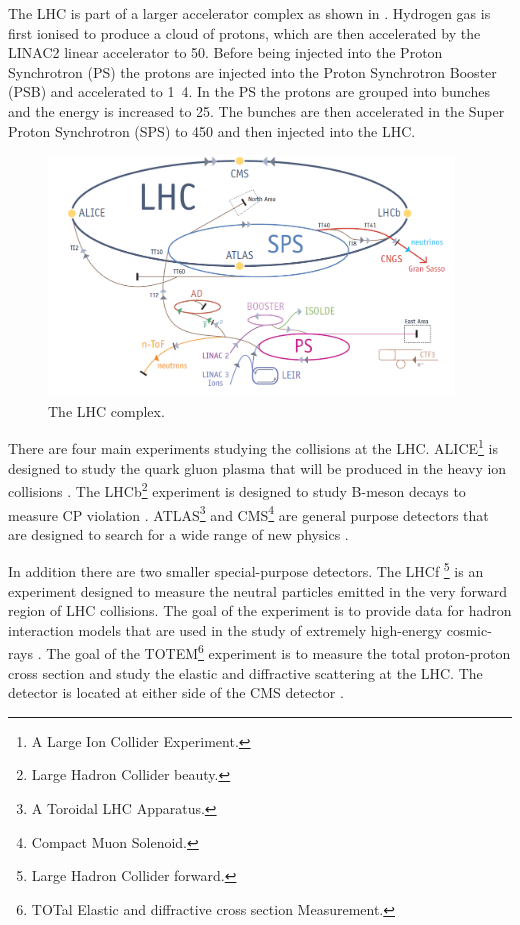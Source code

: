 The LHC is part of a larger accelerator complex as shown in 
. Hydrogen gas is first ionised to produce a cloud of
protons, which are then accelerated by the LINAC2 linear accelerator to
\unit{50}{\MeV}.  Before being injected into the Proton Synchrotron (PS) the
protons are injected into the Proton Synchrotron Booster (PSB) and accelerated
to \unit{1.4}{\GeV}. In the PS the protons are grouped into bunches and the
energy is increased to \unit{25}{\GeV}. The bunches are then accelerated in the
Super Proton Synchrotron (SPS) to \unit{450}{\GeV} and then injected into the
LHC.

\begin{figure}[htbp]
  \centering
  \includegraphics[width=0.96\textwidth]{accelerators.png}
  \caption{The LHC complex.}
  \label{fig:LHCcomplex}
\end{figure}

There are four main experiments studying the collisions at the
{LHC}.  
ALICE\footnote{A Large Ion Collider Experiment.} is designed to study the quark
gluon plasma that will be produced in the heavy ion collisions
\cite{aamodt2008alice}.
The LHCb\footnote{Large Hadron Collider beauty.} experiment is designed to study
B-meson decays to measure CP violation \cite{alves2008lhcb}.
ATLAS\footnote{A Toroidal LHC Apparatus.} and CMS\footnote{Compact Muon
Solenoid.} are general purpose detectors that are designed to search for a wide
range of new physics \cite{chatrchyan2008cms,aad2008atlas}.

In addition there are two smaller special-purpose detectors.
The LHCf \footnote{Large Hadron Collider forward.} is an experiment designed to
measure the neutral particles emitted in the very forward region of LHC
collisions.  The goal of the experiment is to provide data for hadron
interaction models that are used in the study of extremely high-energy
cosmic-rays \cite{adriani2008lhcf}.
The goal of the TOTEM\footnote{TOTal Elastic and diffractive cross section
Measurement.} experiment is to measure the total proton-proton
cross section and study the elastic and diffractive scattering at the LHC. The
detector is located at either side of the CMS detector \cite{anelli2008totem}.

